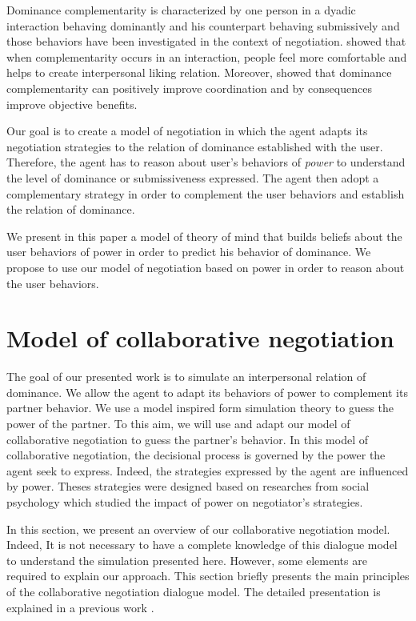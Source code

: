 \documentclass[conference, letterpaper]{IEEEtran}
\begin{document}
	Dominance complementarity is characterized by one person in a dyadic interaction behaving dominantly and his counterpart behaving submissively \cite{tiedens2003power} and those behaviors have been investigated in the context of negotiation. \cite{tiedens2003power} showed that when complementarity occurs in an interaction, people feel more comfortable and helps to create interpersonal liking relation.
	Moreover, \cite{wiltermuth2015benefits} showed that dominance complementarity can positively improve coordination and by consequences improve objective benefits.
	
	Our goal is to create a model of negotiation in which the agent adapts its negotiation strategies to the relation of dominance established with the user. Therefore, the agent has to reason about user's behaviors of \emph{power} to understand the level of dominance or submissiveness expressed. The agent then adopt a complementary strategy in order to complement the user behaviors and establish the relation of dominance.
	
	We present in this paper a model of theory of mind that builds beliefs about the user behaviors of power in order to predict his behavior of dominance. We propose to use our model of negotiation based on power in order to reason about the user behaviors. 
	
	
	\section{Model of collaborative negotiation}
	The goal of our presented work is to simulate an interpersonal relation of dominance. We allow the agent to adapt its behaviors of power to complement its partner behavior. We use a model inspired form simulation theory to guess the power of the partner. To this aim, we will use and adapt our model of collaborative negotiation to guess the partner's behavior. In this model of collaborative negotiation, the decisional process is governed by the power the agent seek to express. Indeed, the strategies expressed by the agent are influenced by power. Theses strategies were designed based on researches from social psychology which studied the impact of power on negotiator's strategies. 
	
	In this section, we present an overview of our collaborative negotiation model. Indeed, It is not necessary to have a complete knowledge of this dialogue model to understand the simulation presented here. However, some elements are required to explain our approach. This section briefly presents the main principles of the collaborative negotiation dialogue model. The detailed presentation is explained in a previous work  \cite{ouali2017computational}.
	
\end{document}
